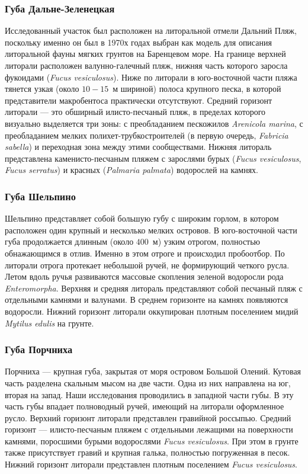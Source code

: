\subsubsection{Губа Дальне-Зеленецкая}
Исследованный   участок   был   расположен   на   литоральной   отмели   Дальний   Пляж, поскольку именно он был в 1970х годах выбран как модель для описания литоральной фауны мягких   грунтов   на   Баренцевом   море.   
На   границе   верхней   литорали   расположен   валунно-галечный   пляж,  нижняя   часть которого заросла фукоидами ({\it Fucus vesiculosus}). 
Ниже по литорали в юго-восточной части пляжа   тянется   узкая   (около   $10-15$~м   шириной)   полоса   крупного   песка,   в   которой представители макробентоса практически отсутствуют.
Средний   горизонт   литорали --- это   обширный   илисто-песчаный   пляж,   в  пределах которого визуально выделяется три зоны: с преобладанием пескожилов  {\it Arenicola marina}, с преобладанием   мелких   полихет-трубкостроителей   (в   первую   очередь, {\it Fabricia   sabella})   и переходная   зона   между   этими   сообществами.   
Нижняя   литораль   представлена   каменисто-песчаным пляжем с зарослями бурых ({\it Fucus vesiculosus}, {\it Fucus serratus}) и красных ({\it Palmaria  palmata}) водорослей на камнях.

\subsubsection{Губа Шельпино}
Шельпино   представляет   собой   большую   губу   с   широким   горлом,   в   котором расположен   один   крупный   и   несколько   мелких   островов.   
В   юго-восточной   части   губа продолжается   длинным   (около   $400$~м)   узким   отрогом,   полностью   обнажающимся   в   отлив. 
Именно в этом отроге и происходил пробоотбор. 
По   литорали   отрога   протекает   небольшой   ручей,   не   формирующий   четкого   русла. 
Летом вдоль ручья развиваются массовые скопления зеленой водоросли рода  {\it Enteromorpha}. 
Верхняя и средняя литораль представляют собой песчаный пляж с отдельными камнями и валунами. 
В среднем горизонте на камнях появляются водоросли. 
Нижний горизонт литорали оккупирован плотным поселением мидий {\it Mytilus edulis} на грунте.

\subsubsection{Губа Порчниха}
Порчниха  ---  крупная   губа,   закрытая   от   моря   островом   Большой   Олений.   
Кутовая часть разделена скальным мысом на две части. 
Одна из них направлена на юг, вторая на запад. 
Наши   исследования   проводились   в   западной   части   губы.   
В   эту   часть   губы   впадает полноводный ручей, имеющий на литорали оформленное русло. 
Верхний горизонт литорали представлен   гравийной   россыпью.   
Средний   горизонт   ---   илисто-песчаным   пляжем   с отдельными   лежащими   на   поверхности   камнями,   поросшими   бурыми   водорослями  {\it Fucus vesiculosus}.   
При   этом   в   грунте   также   присутствует   гравий   и   крупная   галька,   полностью погруженная в песок. 
Нижний горизонт литорали представлен плотным поселением   {\it Fucus  vesiculosus}.

